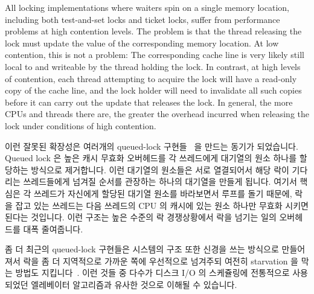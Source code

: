 All locking implementations where waiters spin on a single memory
location, including both test-and-set locks and ticket locks,
suffer from performance problems at high contention levels.
The problem is that the thread releasing the lock must update the
value of the corresponding memory location.
At low contention, this is not a problem: The corresponding cache line
is very likely still local to and writeable by the thread holding
the lock.
In contrast, at high levels of contention, each thread attempting to
acquire the lock will have a read-only copy of the cache line, and
the lock holder will need to invalidate all such copies before it
can carry out the update that releases the lock.
In general, the more CPUs and threads there are, the greater the
overhead incurred when releasing the lock under conditions of
high contention.
\fi

이런 잘못된 확장성은 여러개의 queued-lock
구현들~\cite{Anderson90,Graunke90,MellorCrummey91a,Wisniewski94,Craig93,Magnusson94,Takada93}
을 만드는 동기가 되었습니다.
Queued lock 은 높은 캐시 무효화 오버헤드를 각 쓰레드에게 대기열의 원소 하나를
할당하는 방식으로 제거합니다.
이런 대기열의 원소들은 서로 열결되어서 해당 락이 기다리는 쓰레드들에게 넘겨질
순서를 관장하는 하나의 대기열을 만들게 됩니다.
여기서 핵심은 각 쓰레드가 자신에게 할당된 대기열 원소를 바라보면서 루프를 돌기
때문에, 락을 잡고 있는 쓰레드는 다음 쓰레드의 CPU 의 캐시에 있는 원소 하나만
무효화 시키면 된다는 것입니다.
이런 구조는 높은 수준의 락 경쟁상황에서 락을 넘기는 일의 오버헤드를 대폭
줄여줍니다.

좀 더 최근의 queued-lock 구현들은 시스템의 구조 또한 신경을 쓰는 방식으로
만들어져서 락을 좀 더 지역적으로 가까운 쪽에 우선적으로 넘겨주되 여전히
starvation 을 막는 방법도
지킵니다~\cite{McKenney02e,radovic03hierarchical,radovic02efficient,BenJackson02,McKenney02d}.
이런 것들 중 다수가 디스크 I/O 의 스케쥴링에 전통적으로 사용되었던 엘레베이터
알고리즘과 유사한 것으로 이해될 수 있습니다.

